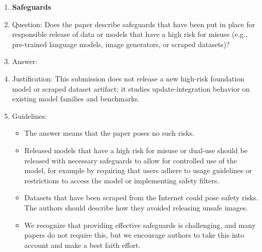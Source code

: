 \documentclass{article}
\begin{document}
\begin{enumerate}
\item {\bf Safeguards}
    \item[] Question: Does the paper describe safeguards that have been put in place for responsible release of data or models that have a high risk for misuse (e.g., pre-trained language models, image generators, or scraped datasets)?
    \item[] Answer: \answerNA{} %
    \item[] Justification: This submission does not release a new high-risk foundation model or scraped dataset artifact; it studies update-integration behavior on existing model families and benchmarks.
    \item[] Guidelines:
    \begin{itemize}
        \item The answer \answerNA{} means that the paper poses no such risks.
        \item Released models that have a high risk for misuse or dual-use should be released with necessary safeguards to allow for controlled use of the model, for example by requiring that users adhere to usage guidelines or restrictions to access the model or implementing safety filters. 
        \item Datasets that have been scraped from the Internet could pose safety risks. The authors should describe how they avoided releasing unsafe images.
        \item We recognize that providing effective safeguards is challenging, and many papers do not require this, but we encourage authors to take this into account and make a best faith effort.
    \end{itemize}


\end{enumerate}
\end{document}
